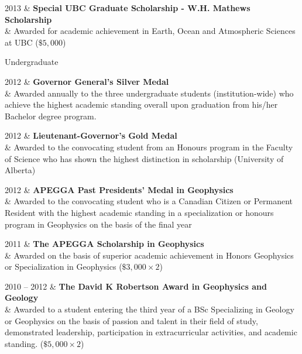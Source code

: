 \documentclass[a4paper, 11pt]{article}
\newcommand{\subheading}[1]{
    \vspace{0.5cm}
    {\Large #1}\\
    \vspace{-0.2cm}
}
\begin{document}
\begin{entryright}
2013 & \textbf{Special UBC Graduate Scholarship - W.H. Mathews Scholarship} \\
& Awarded for academic achievement in Earth, Ocean and Atmospheric Sciences at UBC ($\$5,000$)
\end{entryright}

\subheading{Undergraduate}
\begin{entryright}
2012 & \textbf{Governor General's Silver Medal} \\
& Awarded annually to the three undergraduate students (institution-wide) who achieve the highest academic standing overall upon graduation from his/her Bachelor degree program.
\end{entryright}

\begin{entryright}
2012 & \textbf{Lieutenant-Governor's Gold Medal} \\
& Awarded to the convocating student from an Honours program in the Faculty of Science who has shown the highest distinction in scholarship (University of Alberta)
\end{entryright}

\begin{entryright}
2012 & \textbf{APEGGA Past Presidents' Medal in Geophysics} \\
& Awarded to the convocating student who is a Canadian Citizen or Permanent Resident with the highest academic standing in a specialization or honours program in Geophysics on the basis of the final year
\end{entryright}

\begin{entryright}
2011 & \textbf{The APEGGA Scholarship in Geophysics} \\
& Awarded on the basis of superior academic achievement in Honors Geophysics or Specialization in Geophysics ($\$3,000 \times 2$)
\end{entryright}

\begin{entryright}
2010 -- 2012 & \textbf{The David K Robertson Award in Geophysics and Geology} \\
& Awarded to a student entering the third year of a BSc Specializing in Geology or Geophysics on the basis of passion and talent in their field of study, demonstrated leadership, participation in extracurricular activities, and academic standing. ($\$5,000 \times 2$)
\end{entryright}
\end{document}
